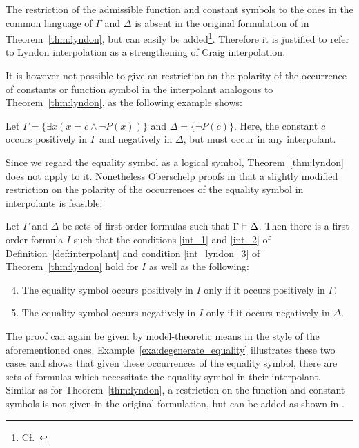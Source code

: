 The restriction of the admissible function and constant symbols to the ones in the common language of $\Gamma$ and $\Delta$ is absent in the original formulation of in Theorem~\ref{thm:lyndon}, but can easily be added\footnote{Cf.\ \cite{motohashi84}}.
Therefore it is justified to refer to Lyndon interpolation as a strengthening of Craig interpolation.

It is however not possible to give an restriction on the polarity of the occurrence of constants or function symbol in the interpolant analogous to Theorem~\ref{thm:lyndon}, as the following example shows: 

\begin{exa}
	Let $\Gamma = \{ \exists x ( x = c \land \lnot P(x)) \}$ and $\Delta = \{ \lnot P(c) \}$.
	Here, the constant $c$ occurs positively in $\Gamma$ and negatively in $\Delta$, but must occur in any interpolant.
\end{exa}

Since we regard the equality symbol as a logical symbol, Theorem~\ref{thm:lyndon} does not apply to it.
Nonetheless
Oberschelp proofs in \cite{oberschelp68} that a slightly modified restriction on the polarity of the occurrences of the equality symbol in interpolants is feasible:

\begin{thm}[Oberschelp]
	\label{thm:oberschelp}
	Let $\Gamma$ and $\Delta$ be sets of first-order formulas such that $\Gamma \entails\nolinebreak \Delta$. 
	Then there is a first-order formula $I$ such that the conditions \ref{int_1} and \ref{int_2} of Definition~\ref{def:interpolant} and condition \ref{int_lyndon_3} of Theorem~\ref{thm:lyndon} hold for $I$ as well as the following:

	\begin{enumerate}%
		\setcounter{enumi}{3}
		\item 
			The equality symbol occurs positively in $I$ only if it occurs positively in $\Gamma$.
		\item
			The equality symbol occurs negatively in $I$ only if it occurs negatively in $\Delta$.
	\end{enumerate}
\end{thm}

The proof can again be given by model-theoretic means in the style of the aforementioned ones.
Example~\ref{exa:degenerate_equality} illustrates these two cases and shows that given these occurrences of the equality symbol, there are sets of formulas which necessitate the equality symbol in their interpolant.
Similar as for Theorem~\ref{thm:lyndon}, a restriction on the function and constant symbols is not given in the original formulation, but can be added as shown in \cite{fujiwara78}.

